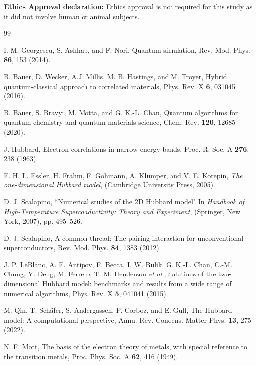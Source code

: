 \documentclass[twocolumn,superscriptaddress,amsmath,amssymb,showpacs,floatfix,preprintnumbers]{revtex4-1}
\begin{document}
\textbf{Ethics Approval declaration:}
Ethics approval is not required for this study as it did not involve human or animal subjects.
   
\begin{thebibliography}{99}

I. M. Georgescu, S. Ashhab, and F. Nori, 
Quantum simulation, 
Rev. Mod. Phys. \textbf{86}, 153 (2014).

B. Bauer, D. Wecker, A.J. Millis, M. B. Hastings, and M. Troyer,
Hybrid quantum-classical approach to correlated materials,
Phys. Rev. X \textbf{6}, 031045 (2016).

B. Bauer, S. Bravyi, M. Motta, and G. K.-L. Chan, 
Quantum algorithms for quantum chemistry and quantum materials science,
Chem. Rev. \textbf{120}, 12685 (2020).

J. Hubbard, 
Electron correlations in narrow energy bands,
Proc. R. Soc. A \textbf{276}, 238 (1963).

F. H. L. Essler, H. Frahm, F. G\"{o}hmann, A. Kl\"{u}mper, and V. E. Korepin, 
\textit{The one-dimensional Hubbard model}, 
(Cambridge University Press, 2005).

D. J. Scalapino, ``Numerical studies of the 2D Hubbard model"
In \textit{Handbook of High-Temperature Superconductivity: Theory and Experiment}, 
(Springer, New York, 2007), pp. 495–526.

D. J. Scalapino,
A common thread: The pairing interaction for unconventional superconductors,
Rev. Mod. Phys. \textbf{84}, 1383 (2012).

J. P. LeBlanc, A. E. Antipov, F. Becca, I. W. Bulik, G. K.-L. Chan, C.-M. Chung, Y. Deng,
M. Ferrero, T. M. Henderson \textit{et al}.,
Solutions of the two-dimensional Hubbard model: benchmarks and results from a wide range of
numerical algorithms,
Phys. Rev. X \textbf{5}, 041041 (2015).

M. Qin, T. Sch\"{a}fer, S. Andergassen, P. Corboz, and E. Gull, 
The Hubbard model: A computational perspective,
Annu. Rev. Condens. Matter Phys. \textbf{13}, 275 (2022).

N. F. Mott, 
The basis of the electron theory of metals, with special reference to the transition metals,
Proc. Phys. Soc. A \textbf{62}, 416 (1949).
 

\end{thebibliography}
\end{document}
